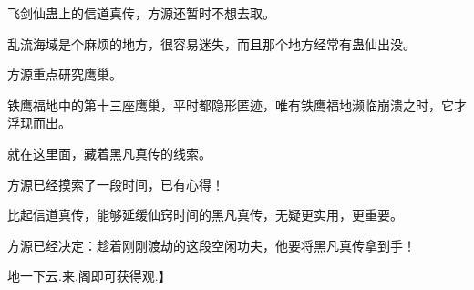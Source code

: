 \begin{this_body}
飞剑仙蛊上的信道真传，方源还暂时不想去取。

乱流海域是个麻烦的地方，很容易迷失，而且那个地方经常有蛊仙出没。

方源重点研究鹰巢。

铁鹰福地中的第十三座鹰巢，平时都隐形匿迹，唯有铁鹰福地濒临崩溃之时，它才浮现而出。

就在这里面，藏着黑凡真传的线索。

方源已经摸索了一段时间，已有心得！

比起信道真传，能够延缓仙窍时间的黑凡真传，无疑更实用，更重要。

方源已经决定：趁着刚刚渡劫的这段空闲功夫，他要将黑凡真传拿到手！

地一下云.来.阁即可获得观.】

\end{this_body}

